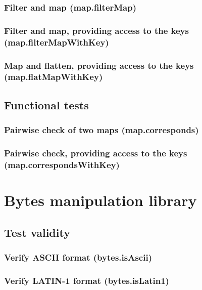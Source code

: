 \documentclass{article}
\theoremstyle{definition}
\begin{document}
\subsubsection{Filter and map (map.filterMap)}

\subsubsection{Filter and map, providing access to the keys (map.filterMapWithKey)}

\subsubsection{Map and flatten, providing access to the keys (map.flatMapWithKey)}

\subsection{Functional tests}

\subsubsection{Pairwise check of two maps (map.corresponds)}

\subsubsection{Pairwise check, providing access to the keys (map.correspondsWithKey)}

\pagebreak
\section{Bytes manipulation library}

\subsection{Test validity}

\subsubsection{Verify ASCII format (bytes.isAscii)}

\subsubsection{Verify LATIN-1 format (bytes.isLatin1)}
\end{document}

